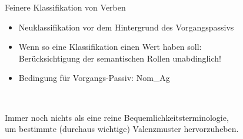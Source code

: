 \begin{frame}
  {Feinere Klassifikation von Verben}
  \pause
  \begin{itemize}[<+->]
    \item Neuklassifikation vor dem Hintergrund des Vorgangspassivs
    \item Wenn so eine Klassifikation einen Wert haben soll:\\
      \alert{Berücksichtigung der semantischen Rollen unabdinglich!}
    \item Bedingung für Vorgangs-Passiv: \alert{Nom\_Ag}
  \end{itemize} 
  \pause
  \Zeile
  \centering
  \\
  \raggedright
  \Zeile
  \pause
  Immer noch nichts als eine reine Bequemlichkeitsterminologie,\\
  um bestimmte (durchaus wichtige) Valenzmuster hervorzuheben.
\end{frame}


